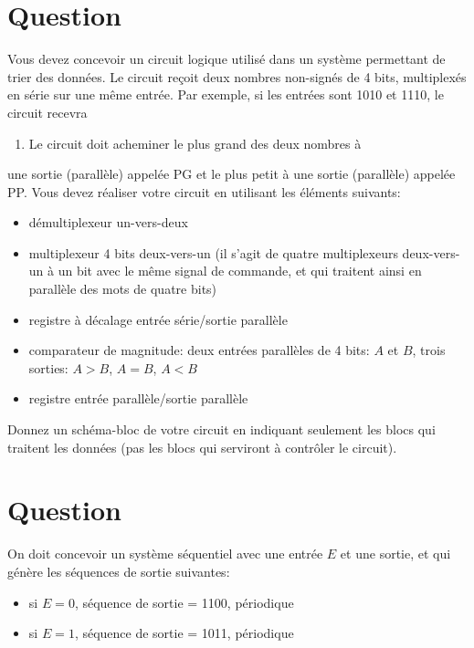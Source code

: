 \documentclass[letter, oneside]{book}
\begin{document}
\section*{Question}
\label{sec:orgec35f9b}
Vous devez concevoir un circuit logique utilisé dans un système
permettant de trier des données. Le circuit reçoit deux nombres
non-signés de 4 bits, multiplexés en série sur une même entrée. Par
exemple, si les entrées sont 1010 et 1110, le circuit recevra
\begin{enumerate}
\item Le circuit doit acheminer le plus grand des deux nombres à
\end{enumerate}
une sortie (parallèle) appelée PG et le plus petit à une sortie
(parallèle) appelée PP. Vous devez réaliser votre circuit en utilisant
les éléments suivants:

\begin{itemize}
\item démultiplexeur un-vers-deux

\item multiplexeur 4 bits deux-vers-un (il s'agit de quatre
multiplexeurs deux-vers-un à un bit avec le même signal de
commande, et qui traitent ainsi en parallèle des mots de quatre bits)

\item registre à décalage entrée série/sortie parallèle

\item comparateur de magnitude: deux entrées parallèles de 4 bits: \(A\) et
\(B\), trois sorties: \(A>B\), \(A=B\), \(A<B\)

\item registre entrée parallèle/sortie parallèle
\end{itemize}

Donnez un schéma-bloc de votre circuit en indiquant seulement les
blocs qui traitent les données (pas les blocs qui serviront à contrôler
le circuit).

\section*{Question}
\label{sec:orgccddb7e}
On doit concevoir un système séquentiel avec une entrée \(E\) et une
sortie, et qui génère les séquences de sortie suivantes:

\begin{itemize}
\item si \(E=0\), séquence de sortie = 1100, périodique

\item si \(E=1\), séquence de sortie = 1011, périodique
\end{itemize}
\end{document}
